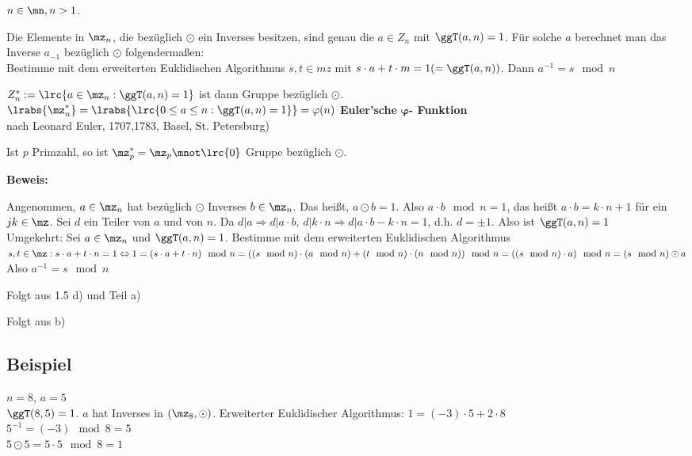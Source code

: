 	$n\in\mn,n>1$.
		\item Die Elemente in $\mz_n$, die bezüglich $\odot$ ein Inverses besitzen, sind genau die $a\in Z_n$ mit $\ggT(a,n)=1$. Für solche $a$ berechnet man das Inverse $a_{-1}$ bezüglich $\odot$ folgendermaßen:\\
		Bestimme mit dem erweiterten Euklidischen Algorithmus $s,t\in mz$ mit $s\cdot a+t\cdot m=1(=\ggT(a,n))$. Dann $a^{-1}=s\mod n$

		\item $Z_n^*:=\lrc{a\in\mz_n:\ggT(a,n)=1}$ ist dann Gruppe bezüglich $\odot$.\\
		$\lrabs{\mz_n^*}=\lrabs{\lrc{0\leq a\leq n:\ggT(a,n)=1}}=\varphi(n)$ \textbf{Euler'sche} $\mathbf{\varphi}$\textbf{- Funktion}\\ nach Leonard Euler, 1707,1783, Basel, St. Petersburg)

		\item Ist $p$ Primzahl, so ist $\mz_p^*=\mz_p\mnot\lrc{0}$ Gruppe bezüglich $\odot$.
	\subExEnd

	\textbf{Beweis:}
		\item Angenommen, $a\in\mz_n$ hat bezüglich $\odot$ Inverses $b\in\mz_n$. Das heißt, $a\odot b=1$. Also $a\cdot b\mod n=1$, das heißt $a\cdot b=k\cdot n+1$ für ein $jk\in\mz$. Sei $d$ ein Teiler von $a$ und von $n$. Da $d|a\Rightarrow d|a\cdot b$, $d|k\cdot n\Rightarrow d|a\cdot b-k\cdot n=1$, d.h. $d=\pm 1$. Also ist $\ggT(a,n)=1$\\
		Umgekehrt: Sei $a\in\mz_n$ und $\ggT(a,n)=1$. Bestimme mit dem erweiterten Euklidischen Algorithmus $s,t\in\mz:s\cdot a+t\cdot n=1\Leftrightarrow 1=(s\cdot a+t\cdot n)\mod n=((s\mod n)\cdot(a\mod n)+(t\mod n)\cdot(n\mod n))\mod n=((s\mod n)\cdot a)\mod n=(s\mod n)\odot a$\\
		Also $a^{-1}=s\mod n$

		\item Folgt aus 1.5 d) und Teil a)
		\item Folgt aus b)
	\subExEnd

	\subsection{Beispiel}

	$n=8$, $a=5$\\
	$\ggT(8,5)=1$. $a$ hat Inverses in $(\mz_8,\odot)$.
	Erweiterter Euklidischer Algorithmus: $1=(-3)\cdot 5+2\cdot 8$\\
	$5^{-1}=(-3)\mod 8=5$\\
	$5\odot 5=5\cdot 5\mod 8=1$

